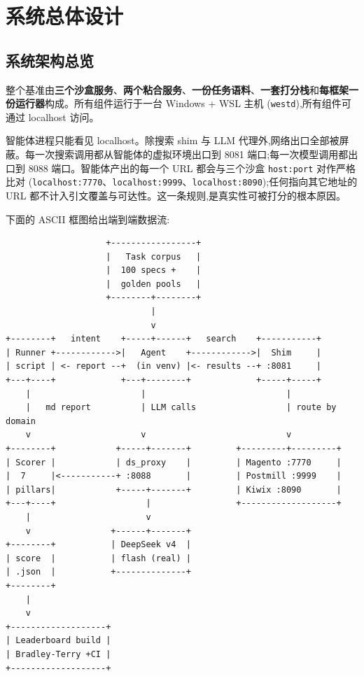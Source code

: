 \documentclass[UTF8,a4paper,12pt,oneside]{ctexart}
\begin{document}
\section{系统总体设计}

\subsection{系统架构总览}

整个基准由\textbf{三个沙盒服务}、\textbf{两个粘合服务}、\textbf{一份任务语料}、\textbf{一套打分栈}和\textbf{每框架一份运行器}构成。所有组件运行于一台 Windows + WSL 主机 (\texttt{westd}),所有组件可通过 localhost 访问。

智能体进程只能看见 localhost。除搜索 shim 与 LLM 代理外,网络出口全部被屏蔽。每一次搜索调用都从智能体的虚拟环境出口到 8081 端口;每一次模型调用都出口到 8088 端口。智能体产出的每一个 URL 都会与三个沙盒 \texttt{host:port} 对作严格比对 (\texttt{localhost:7770}、\texttt{localhost:9999}、\texttt{localhost:8090});任何指向其它地址的 URL 都不计入引文覆盖与可达性。这一条规则,是真实性可被打分的根本原因。

下面的 ASCII 框图给出端到端数据流:

\begin{verbatim}
                    +-----------------+
                    |   Task corpus   |
                    |  100 specs +    |
                    |  golden pools   |
                    +--------+--------+
                             |
                             v
+--------+   intent    +-----+------+   search    +-----------+
| Runner +------------>|   Agent    +------------>|  Shim     |
| script | <- report --+  (in venv) |<- results --+ :8081     |
+---+----+             +---+--------+             +-----+-----+
    |                      |                            |
    |   md report          | LLM calls                  | route by domain
    v                      v                            v
+--------+            +-----+-------+         +---------+---------+
| Scorer |            | ds_proxy    |         | Magento :7770     |
|  7     |<-----------+ :8088       |         | Postmill :9999    |
| pillars|            +-----+-------+         | Kiwix :8090       |
+---+----+                  |                 +-------------------+
    |                       v
    v                +------+-------+
+--------+           | DeepSeek v4  |
| score  |           | flash (real) |
| .json  |           +--------------+
+--------+
    |
    v
+-------------------+
| Leaderboard build |
| Bradley-Terry +CI |
+-------------------+
\end{verbatim}
\end{document}
